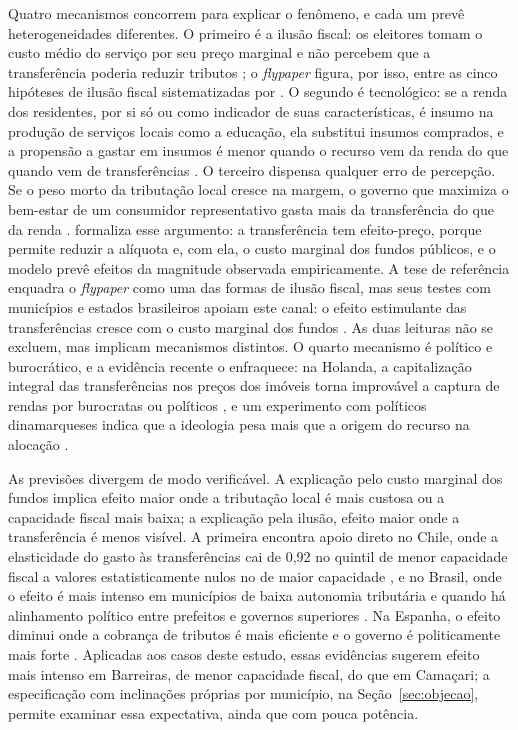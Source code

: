 Quatro mecanismos concorrem para explicar o fenômeno, e cada um prevê heterogeneidades diferentes. O primeiro é a ilusão fiscal: os eleitores tomam o custo médio do serviço por seu preço marginal e não percebem que a transferência poderia reduzir tributos \citep{HinesThaler1995}; o \textit{flypaper} figura, por isso, entre as cinco hipóteses de ilusão fiscal sistematizadas por \citet{DolleryWorthington1996}. O segundo é tecnológico: se a renda dos residentes, por si só ou como indicador de suas características, é insumo na produção de serviços locais como a educação, ela substitui insumos comprados, e a propensão a gastar em insumos é menor quando o recurso vem da renda do que quando vem de transferências \citep{HamiltonB1983}. O terceiro dispensa qualquer erro de percepção. Se o peso morto da tributação local cresce na margem, o governo que maximiza o bem-estar de um consumidor representativo gasta mais da transferência do que da renda \citep{HamiltonJ1986}. \citet{Dahlby2011} formaliza esse argumento: a transferência tem efeito-preço, porque permite reduzir a alíquota e, com ela, o custo marginal dos fundos públicos, e o modelo prevê efeitos da magnitude observada empiricamente. A tese de referência enquadra o \textit{flypaper} como uma das formas de ilusão fiscal, mas seus testes com municípios e estados brasileiros apoiam este canal: o efeito estimulante das transferências cresce com o custo marginal dos fundos \citep{Ferreira2021}. As duas leituras não se excluem, mas implicam mecanismos distintos. O quarto mecanismo é político e burocrático, e a evidência recente o enfraquece: na Holanda, a capitalização integral das transferências nos preços dos imóveis torna improvável a captura de rendas por burocratas ou políticos \citep{Allers2016115}, e um experimento com políticos dinamarqueses indica que a ideologia pesa mais que a origem do recurso na alocação \citep{Baekgaard2016189}.

As previsões divergem de modo verificável. A explicação pelo custo marginal dos fundos implica efeito maior onde a tributação local é mais custosa ou a capacidade fiscal mais baixa; a explicação pela ilusão, efeito maior onde a transferência é menos visível. A primeira encontra apoio direto no Chile, onde a elasticidade do gasto às transferências cai de 0,92 no quintil de menor capacidade fiscal a valores estatisticamente nulos no de maior capacidade \citep{Saens2026}, e no Brasil, onde o efeito é mais intenso em municípios de baixa autonomia tributária e quando há alinhamento político entre prefeitos e governos superiores \citep{Ferreira2019203}. Na Espanha, o efeito diminui onde a cobrança de tributos é mais eficiente e o governo é politicamente mais forte \citep{Rios2022793}. Aplicadas aos casos deste estudo, essas evidências sugerem efeito mais intenso em Barreiras, de menor capacidade fiscal, do que em Camaçari; a especificação com inclinações próprias por município, na Seção~\ref{sec:objecao}, permite examinar essa expectativa, ainda que com pouca potência.

